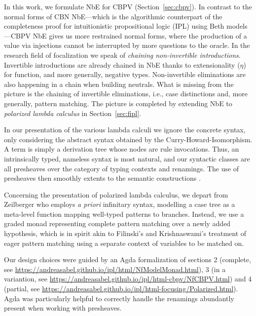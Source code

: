 \documentclass[sigconf,screen,fleqn]{acmart} %
\begin{document}
In this work, we formulate NbE for CBPV
(Section~\ref{sec:cbpv}).
%
In contrast to the normal forms of CBN NbE---which is the algorithmic
counterpart of the completeness proof for intuitionistic propositional
logic (IPL) using Beth models---CBPV NbE gives us more restrained
normal forms, where the production of a value via injections cannot be
interrupted by more questions to the oracle.  In the research field of
focalization \cite{andreoli:focusing,liangMiller:csl07} we speak of
\emph{chaining non-invertible introductions}.
Invertible introductions are already chained in NbE thanks to
extensionality ($\eta$) for function, and more generally, negative
types.  Non-invertible eliminations are also happening in a chain when
building neutrals.  What is missing from the picture is the chaining
of invertible eliminations, i.e., case distinctions and, more
generally, pattern matching.  The picture is completed by extending
NbE to \emph{polarized lambda calculus}
\cite{zeilberger:PhD,brockNannestadSchuermann:lpar10,espiritoSanto:entcs17}
in Section~\ref{sec:fipl}.


In our presentation of the various lambda calculi we ignore the
concrete syntax, only considering the abstract syntax obtained by the
Curry-Howard-Isomorphism.  A term is simply a derivation tree whose
nodes are rule invocations.  Thus, an intrinsically typed,
nameless syntax is most natural,
and our syntactic classes are all presheaves over the category of
typing contexts and renamings.  The use of presheaves then smoothly
extents to the semantic constructions
\cite{catarina:csl93,altenkirchHofmannStreicher:ctcs95}.

Concerning the presentation of polarized lambda calculus, we depart from
Zeilberger \cite{zeilberger:PhD} who employs \emph{a priori}
infinitary syntax, modelling a case tree as a meta-level function mapping
well-typed patterns to branches.  Instead, we use a graded monad
representing complete pattern matching over a newly added hypothesis,
which is in spirit akin to Filinski's \cite[Section~4]{filinski:tlca01}
and Krishnaswami's \cite{krishnaswami:popl09} treatment of eager
pattern matching using a separate context of variables to be matched
on.

Our design choices were guided by an Agda formalization of sections 2
(complete, see
\url{https://andreasabel.github.io/ipl/html/NfModelMonad.html}),
3 (in a variantion, see \url{https://andreasabel.github.io/ipl/html-cbpv/NfCBPV.html})
and 4 (partial, see \url{https://andreasabel.github.io/ipl/html-focusing/Polarized.html}).
Agda was particularly helpful to correctly handle the renamings
abundantly present when working with presheaves.
\end{document}
